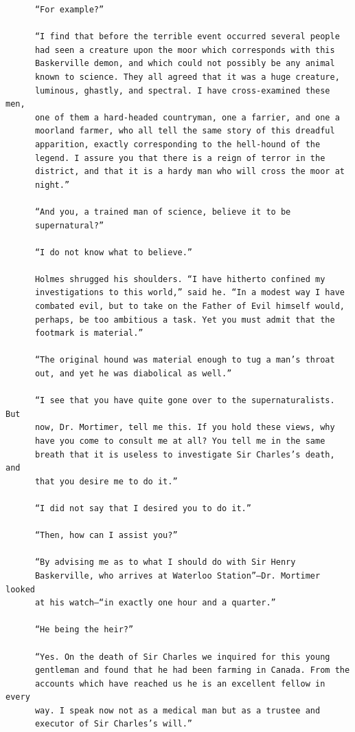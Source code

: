 \documentclass{article}
\begin{document}
\begin{verbatim}
      “For example?”

      “I find that before the terrible event occurred several people
      had seen a creature upon the moor which corresponds with this
      Baskerville demon, and which could not possibly be any animal
      known to science. They all agreed that it was a huge creature,
      luminous, ghastly, and spectral. I have cross-examined these men,
      one of them a hard-headed countryman, one a farrier, and one a
      moorland farmer, who all tell the same story of this dreadful
      apparition, exactly corresponding to the hell-hound of the
      legend. I assure you that there is a reign of terror in the
      district, and that it is a hardy man who will cross the moor at
      night.”

      “And you, a trained man of science, believe it to be
      supernatural?”

      “I do not know what to believe.”

      Holmes shrugged his shoulders. “I have hitherto confined my
      investigations to this world,” said he. “In a modest way I have
      combated evil, but to take on the Father of Evil himself would,
      perhaps, be too ambitious a task. Yet you must admit that the
      footmark is material.”

      “The original hound was material enough to tug a man’s throat
      out, and yet he was diabolical as well.”

      “I see that you have quite gone over to the supernaturalists. But
      now, Dr. Mortimer, tell me this. If you hold these views, why
      have you come to consult me at all? You tell me in the same
      breath that it is useless to investigate Sir Charles’s death, and
      that you desire me to do it.”

      “I did not say that I desired you to do it.”

      “Then, how can I assist you?”

      “By advising me as to what I should do with Sir Henry
      Baskerville, who arrives at Waterloo Station”—Dr. Mortimer looked
      at his watch—“in exactly one hour and a quarter.”

      “He being the heir?”

      “Yes. On the death of Sir Charles we inquired for this young
      gentleman and found that he had been farming in Canada. From the
      accounts which have reached us he is an excellent fellow in every
      way. I speak now not as a medical man but as a trustee and
      executor of Sir Charles’s will.”


\end{verbatim}
\end{document}
